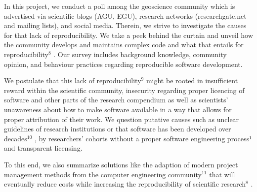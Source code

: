 \documentclass{article}
\begin{document}
In this project, we conduct a poll among the geoscience community which is advertised via scientific blogs (AGU, EGU), research networks (researchgate.net and mailing lists), and social media.
Therein, we strive to investigate the causes for that lack of reproducibility.
We take a peek behind the curtain and unveil how the community develops and maintains complex code and what that entails for reproducibility$^{8}$ .
Our survey includes background knowledge, community opinion, and behaviour practices regarding reproducible software development.

We postulate that this lack of reproducibility$^{9}$  might be rooted in insufficient reward within the scientific community, insecurity regarding proper licencing of software and other parts of the research compendium as well as scientists’ unawareness about how to make software available in a way that allows for proper attribution of their work.
We question putative causes such as unclear guidelines of research institutions or that software has been developed over decades$^{10}$ , by researchers' cohorts without a proper software engineering process¹ and transparent licensing.

To this end, we also summarize solutions like the adaption of modern project management methods from the computer engineering community$^{11}$  that will eventually reduce costs while increasing the reproducibility of scientific research$^{8}$ .
\end{document}
